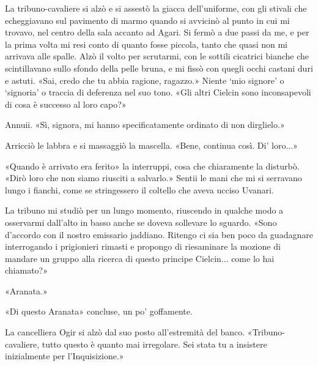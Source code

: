 La tribuno-cavaliere si alzò e si assestò la giacca dell'uniforme, con
gli stivali che echeggiavano sul pavimento di marmo quando si avvicinò
al punto in cui mi trovavo, nel centro della sala accanto ad Agari. Si
fermò a due passi da me, e per la prima volta mi resi conto di quanto
fosse piccola, tanto che quasi non mi arrivava alle spalle. Alzò il
volto per scrutarmi, con le sottili cicatrici bianche che scintillavano
sullo sfondo della pelle bruna, e mi fissò con quegli occhi castani duri
e astuti. «Sai, credo che tu abbia ragione, ragazzo.» Niente `mio
signore' o `signoria' o traccia di deferenza nel suo tono. «Gli altri
Cielcin sono inconsapevoli di cosa è successo al loro capo?»

Annuii. «Sì, signora, mi hanno specificatamente ordinato di non
dirglielo.»

Arricciò le labbra e si massaggiò la mascella. «Bene, continua così. Di'
loro...»

«Quando è arrivato era ferito» la interruppi, cosa che chiaramente la
disturbò. «Dirò loro che non siamo riusciti a salvarlo.» Sentii le mani
che mi si serravano lungo i fianchi, come se stringessero il coltello
che aveva ucciso Uvanari.

La tribuno mi studiò per un lungo momento, riuscendo in qualche modo a
osservarmi dall'alto in basso anche se doveva sollevare lo sguardo.
«Sono d'accordo con il nostro emissario jaddiano. Ritengo ci sia ben
poco da guadagnare interrogando i prigionieri rimasti e propongo di
riesaminare la mozione di mandare un gruppo alla ricerca di questo
principe Cielcin... come lo hai chiamato?»

«Aranata.»

«Di questo Aranata» concluse, un po' goffamente.

La cancelliera Ogir si alzò dal suo posto all'estremità del banco.
«Tribuno-cavaliere, tutto questo è quanto mai irregolare. Sei stata tu a
insistere inizialmente per l'Inquisizione.»


